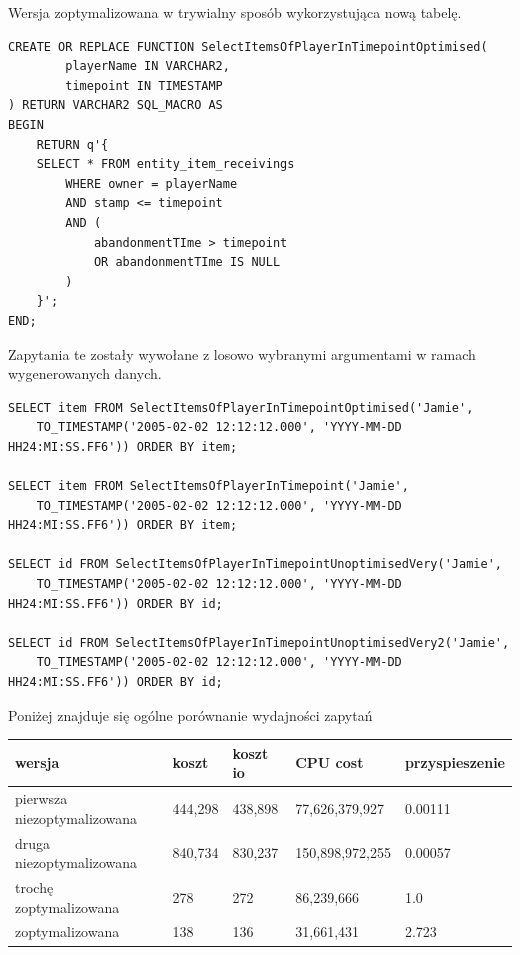 \documentclass[11pt]{article}
\numberwithin{figure}{subsection}
\begin{document}
		Wersja zoptymalizowana w trywialny sposób wykorzystująca nową tabelę.
			
		\begin{lstlisting}[caption={Wersja zoptymalizowana},captionpos=b]
CREATE OR REPLACE FUNCTION SelectItemsOfPlayerInTimepointOptimised(
		playerName IN VARCHAR2,
		timepoint IN TIMESTAMP
) RETURN VARCHAR2 SQL_MACRO AS
BEGIN
	RETURN q'{
	SELECT * FROM entity_item_receivings
		WHERE owner = playerName
		AND stamp <= timepoint
		AND (
			abandonmentTIme > timepoint
			OR abandonmentTIme IS NULL
		)
	}';
END;
		\end{lstlisting}
		
		Zapytania te zostały wywołane z losowo wybranymi argumentami w ramach
		wygenerowanych danych. \\
		
		\begin{lstlisting}[caption={Wywołanie zapytań}, captionpos=b]
SELECT item FROM SelectItemsOfPlayerInTimepointOptimised('Jamie',
	TO_TIMESTAMP('2005-02-02 12:12:12.000', 'YYYY-MM-DD HH24:MI:SS.FF6')) ORDER BY item;

SELECT item FROM SelectItemsOfPlayerInTimepoint('Jamie',
	TO_TIMESTAMP('2005-02-02 12:12:12.000', 'YYYY-MM-DD HH24:MI:SS.FF6')) ORDER BY item;

SELECT id FROM SelectItemsOfPlayerInTimepointUnoptimisedVery('Jamie',
	TO_TIMESTAMP('2005-02-02 12:12:12.000', 'YYYY-MM-DD HH24:MI:SS.FF6')) ORDER BY id;

SELECT id FROM SelectItemsOfPlayerInTimepointUnoptimisedVery2('Jamie',
	TO_TIMESTAMP('2005-02-02 12:12:12.000', 'YYYY-MM-DD HH24:MI:SS.FF6')) ORDER BY id;
		\end{lstlisting}
		
		Poniżej znajduje się ogólne porównanie wydajności zapytań \\
		
		\begin{tabularx}{\textwidth}{|X|X|X|X|X|}
			\hline
			wersja & koszt & koszt io & CPU cost & przyspieszenie \\
			\hline
			pierwsza niezoptymalizowana & 444,298 & 438,898 & 77,626,379,927 &
			0.00111 \\
			\hline
			druga niezoptymalizowana & 840,734 & 830,237 & 150,898,972,255 &
			0.00057 \\
			\hline
			trochę zoptymalizowana & 278 & 272 & 86,239,666 & 1.0 \\
			\hline
			zoptymalizowana & 138 & 136 & 31,661,431 & 2.723 \\
			\hline
		\end{tabularx}
		
\end{document}
